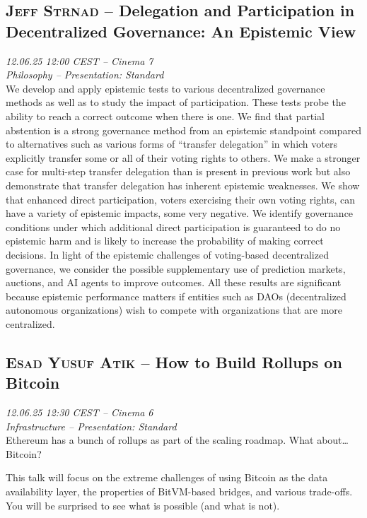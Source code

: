 \subsection {\textsc{Jeff Strnad}  -- Delegation and Participation in  Decentralized Governance: An Epistemic View} \noindent \textit {12.06.25 12:00 CEST -- Cinema 7\\ Philosophy -- Presentation: Standard}\\[1em] We develop and apply epistemic tests to various decentralized governance
methods as well as to study the impact of participation. These
tests probe the ability to reach a correct outcome when there is one.
We find that partial abstention is a strong governance method from an
epistemic standpoint compared to alternatives such as various forms
of “transfer delegation” in which voters explicitly transfer some or all
of their voting rights to others. We make a stronger case for multi-step
transfer delegation than is present in previous work but also demonstrate
that transfer delegation has inherent epistemic weaknesses. We
show that enhanced direct participation, voters exercising their own
voting rights, can have a variety of epistemic impacts, some very negative.
We identify governance conditions under which additional direct
participation is guaranteed to do no epistemic harm and is likely to
increase the probability of making correct decisions. In light of the
epistemic challenges of voting-based decentralized governance, we consider
the possible supplementary use of prediction markets, auctions,
and AI agents to improve outcomes. All these results are significant
because epistemic performance matters if entities such as DAOs (decentralized
autonomous organizations) wish to compete with organizations
that are more centralized.

\clearpage
\subsection {\textsc{Esad Yusuf Atik}  -- How to Build Rollups on Bitcoin} \noindent \textit {12.06.25 12:30 CEST -- Cinema 6\\ Infrastructure -- Presentation: Standard}\\[1em] Ethereum has a bunch of rollups as part of the scaling roadmap. What about\ldots{} Bitcoin?

This talk will focus on the extreme challenges of using Bitcoin as the data availability layer, the properties of BitVM-based bridges, and various trade-offs. You will be surprised to see what is possible (and what is not).

